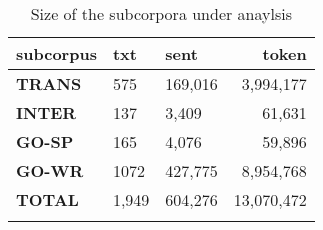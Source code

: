 \documentclass[output=paper,colorlinks,citecolor=brown]{langscibook}
\begin{document}

\begin{table}
    \centering
    \begin{tabularx}{\textwidth}{XYYr}
    \lsptoprule
    \bf subcorpus & \bf txt &\bf sent &\bf  token  \\
    \midrule
\bf TRANS & 575 & 169,016 & 3,994,177\\
\bf INTER & 137 & 3,409 &61,631\\
\bf GO-SP & 165 & 4,076 & 59,896 \\
\bf GO-WR & 1072 & 427,775 & 8,954,768\\
\midrule
\bf TOTAL & 1,949 & 604,276 &13,070,472\\
\lspbottomrule
    \end{tabularx}
    \caption{Size of the subcorpora under anaylsis}
    \label{tab:corpus}
\end{table}{}


\end{document}
